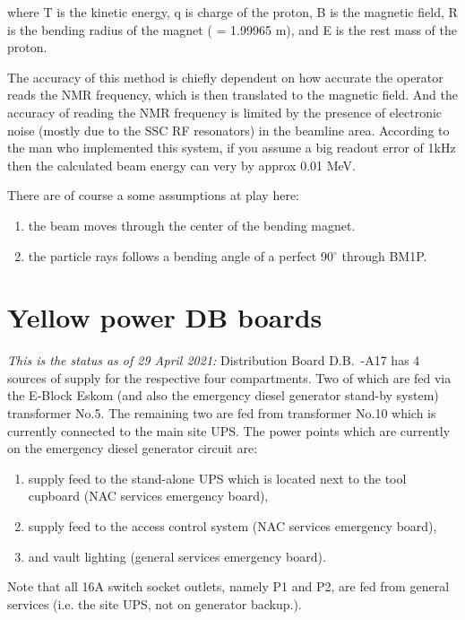 \documentclass[11pt]{report}
\begin{document}
\noindent where  
T is the kinetic energy,
q is charge of the proton,
B is the magnetic field,
R is the bending radius of the magnet ( = 1.99965 m), and
E is the rest mass of the proton.

The accuracy of this method is chiefly dependent on how accurate
the operator reads the NMR frequency, which is then translated to the
magnetic field. And the accuracy of reading the NMR frequency is 
limited by the presence of electronic noise (mostly due to the SSC
RF resonators) in the beamline area.
According to the man who implemented this system, if you assume a
big readout error of 1kHz then the calculated beam energy can very by
approx 0.01 MeV.

There are of course a some assumptions at play here:
\begin{enumerate}
	\item the beam moves through the center of the bending magnet.
	\item the particle rays follows a bending angle of a perfect 90$^{\circ}$ through BM1P.
\end{enumerate}




\section{Yellow power DB boards}

{\it This is the status as of 29 April 2021:}
Distribution Board D.B.~-A17 has 4 sources of supply for the respective four
compartments. Two of which are fed via the E-Block Eskom (and also the emergency diesel generator stand-by
system) transformer No.5. The remaining two are fed from transformer No.10 which is
currently connected to the main site UPS.
The power points which are currently on the emergency diesel generator circuit are:
\begin{enumerate}
	\item supply feed to the stand-alone UPS which is located next to the tool cupboard
		(NAC services emergency board),
	\item supply feed to the access control system (NAC services emergency board),
	\item and vault lighting (general services emergency board).
\end{enumerate}
\noindent Note that all 16A switch socket outlets, namely P1 and P2, are fed from general
services (i.e. the site UPS, not on generator backup.).
\end{document}
